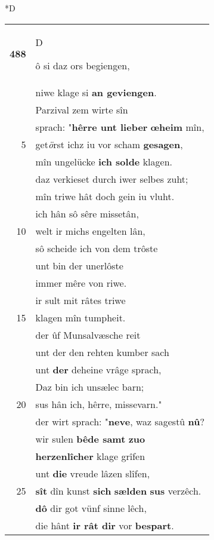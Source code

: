 \documentclass[8pt,a4paper,notitlepage]{article}
\begin{document}
\begin{table}[ht]
\begin{minipage}[t]{0.5\linewidth}
\small
\begin{center}*D
\end{center}
\begin{tabular}{rl}
\textbf{488} & \begin{large}D\end{large}ô si daz ors begiengen,\\ 
 & niwe klage si \textbf{an geviengen}.\\ 
 & Parzival zem wirte sîn\\ 
 & sprach: "\textbf{hêrre unt lieber} \textbf{œheim} mîn,\\ 
5 & get\textit{ö}rst ichz iu vor scham \textbf{gesagen},\\ 
 & mîn ungelücke \textbf{ich solde} klagen.\\ 
 & daz verkieset durch iwer selbes zuht;\\ 
 & mîn triwe hât doch gein iu vluht.\\ 
 & ich hân sô sêre missetân,\\ 
10 & welt ir michs engelten lân,\\ 
 & sô scheide ich von dem trôste\\ 
 & unt bin der unerlôste\\ 
 & immer mêre von riwe.\\ 
 & ir sult mit râtes triwe\\ 
15 & klagen mîn tumpheit.\\ 
 & der ûf Munsalvæsche reit\\ 
 & unt der den rehten kumber sach\\ 
 & unt \textbf{der} deheine vrâge sprach,\\ 
 & Daz bin ich unsælec barn;\\ 
20 & sus hân ich, hêrre, missevarn."\\ 
 & der wirt sprach: "\textbf{neve}, waz sagestû \textbf{nû}?\\ 
 & wir sulen \textbf{bêde samt} \textbf{zuo}\\ 
 & \textbf{herzenlîcher} klage grîfen\\ 
 & unt \textbf{die} vreude lâzen slîfen,\\ 
25 & \textbf{sît} dîn kunst \textbf{sich} \textbf{sælden} \textbf{sus} verzêch.\\ 
 & \textbf{dô} dir got vünf sinne lêch,\\ 
 & die hânt \textbf{ir rât dir} vor \textbf{bespart}.\\ 

\end{tabular}
\end{minipage}
\end{table}
\end{document}
